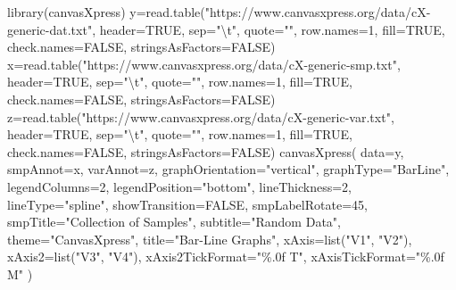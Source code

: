 \documentclass[
  letterpaper,
  DIV=11,
  numbers=noendperiod]{scrreprt}
\newenvironment{Shaded}{\begin{snugshade}}{\end{snugshade}}
\newcommand{\AttributeTok}[1]{\textcolor[rgb]{0.40,0.45,0.13}{#1}}
\newcommand{\ConstantTok}[1]{\textcolor[rgb]{0.56,0.35,0.01}{#1}}
\newcommand{\DecValTok}[1]{\textcolor[rgb]{0.68,0.00,0.00}{#1}}
\newcommand{\FunctionTok}[1]{\textcolor[rgb]{0.28,0.35,0.67}{#1}}
\newcommand{\NormalTok}[1]{\textcolor[rgb]{0.00,0.23,0.31}{#1}}
\newcommand{\OtherTok}[1]{\textcolor[rgb]{0.00,0.23,0.31}{#1}}
\newcommand{\SpecialCharTok}[1]{\textcolor[rgb]{0.37,0.37,0.37}{#1}}
\newcommand{\StringTok}[1]{\textcolor[rgb]{0.13,0.47,0.30}{#1}}
\begin{document}
\begin{Shaded}
\begin{Highlighting}[]
\FunctionTok{library}\NormalTok{(canvasXpress)}
\NormalTok{y}\OtherTok{=}\FunctionTok{read.table}\NormalTok{(}\StringTok{"https://www.canvasxpress.org/data/cX{-}generic{-}dat.txt"}\NormalTok{, }\AttributeTok{header=}\ConstantTok{TRUE}\NormalTok{, }\AttributeTok{sep=}\StringTok{"}\SpecialCharTok{\textbackslash{}t}\StringTok{"}\NormalTok{, }\AttributeTok{quote=}\StringTok{""}\NormalTok{, }\AttributeTok{row.names=}\DecValTok{1}\NormalTok{, }\AttributeTok{fill=}\ConstantTok{TRUE}\NormalTok{, }\AttributeTok{check.names=}\ConstantTok{FALSE}\NormalTok{, }\AttributeTok{stringsAsFactors=}\ConstantTok{FALSE}\NormalTok{)}
\NormalTok{x}\OtherTok{=}\FunctionTok{read.table}\NormalTok{(}\StringTok{"https://www.canvasxpress.org/data/cX{-}generic{-}smp.txt"}\NormalTok{, }\AttributeTok{header=}\ConstantTok{TRUE}\NormalTok{, }\AttributeTok{sep=}\StringTok{"}\SpecialCharTok{\textbackslash{}t}\StringTok{"}\NormalTok{, }\AttributeTok{quote=}\StringTok{""}\NormalTok{, }\AttributeTok{row.names=}\DecValTok{1}\NormalTok{, }\AttributeTok{fill=}\ConstantTok{TRUE}\NormalTok{, }\AttributeTok{check.names=}\ConstantTok{FALSE}\NormalTok{, }\AttributeTok{stringsAsFactors=}\ConstantTok{FALSE}\NormalTok{)}
\NormalTok{z}\OtherTok{=}\FunctionTok{read.table}\NormalTok{(}\StringTok{"https://www.canvasxpress.org/data/cX{-}generic{-}var.txt"}\NormalTok{, }\AttributeTok{header=}\ConstantTok{TRUE}\NormalTok{, }\AttributeTok{sep=}\StringTok{"}\SpecialCharTok{\textbackslash{}t}\StringTok{"}\NormalTok{, }\AttributeTok{quote=}\StringTok{""}\NormalTok{, }\AttributeTok{row.names=}\DecValTok{1}\NormalTok{, }\AttributeTok{fill=}\ConstantTok{TRUE}\NormalTok{, }\AttributeTok{check.names=}\ConstantTok{FALSE}\NormalTok{, }\AttributeTok{stringsAsFactors=}\ConstantTok{FALSE}\NormalTok{)}
\FunctionTok{canvasXpress}\NormalTok{(}
  \AttributeTok{data=}\NormalTok{y,}
  \AttributeTok{smpAnnot=}\NormalTok{x,}
  \AttributeTok{varAnnot=}\NormalTok{z,}
  \AttributeTok{graphOrientation=}\StringTok{"vertical"}\NormalTok{,}
  \AttributeTok{graphType=}\StringTok{"BarLine"}\NormalTok{,}
  \AttributeTok{legendColumns=}\DecValTok{2}\NormalTok{,}
  \AttributeTok{legendPosition=}\StringTok{"bottom"}\NormalTok{,}
  \AttributeTok{lineThickness=}\DecValTok{2}\NormalTok{,}
  \AttributeTok{lineType=}\StringTok{"spline"}\NormalTok{,}
  \AttributeTok{showTransition=}\ConstantTok{FALSE}\NormalTok{,}
  \AttributeTok{smpLabelRotate=}\DecValTok{45}\NormalTok{,}
  \AttributeTok{smpTitle=}\StringTok{"Collection of Samples"}\NormalTok{,}
  \AttributeTok{subtitle=}\StringTok{"Random Data"}\NormalTok{,}
  \AttributeTok{theme=}\StringTok{"CanvasXpress"}\NormalTok{,}
  \AttributeTok{title=}\StringTok{"Bar{-}Line Graphs"}\NormalTok{,}
  \AttributeTok{xAxis=}\FunctionTok{list}\NormalTok{(}\StringTok{"V1"}\NormalTok{, }\StringTok{"V2"}\NormalTok{),}
  \AttributeTok{xAxis2=}\FunctionTok{list}\NormalTok{(}\StringTok{"V3"}\NormalTok{, }\StringTok{"V4"}\NormalTok{),}
  \AttributeTok{xAxis2TickFormat=}\StringTok{"\%.0f T"}\NormalTok{,}
  \AttributeTok{xAxisTickFormat=}\StringTok{"\%.0f M"}
\NormalTok{)}
\end{Highlighting}
\end{Shaded}
\end{document}
